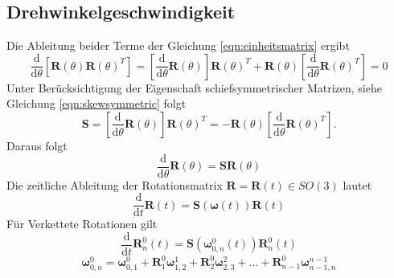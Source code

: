 \subsection{Drehwinkelgeschwindigkeit}
Die Ableitung beider Terme der Gleichung \ref{eqn:einheitsmatrix} ergibt
\begin{equation} 
	\frac{\text{d}}{\text{d}\theta}\left[\bm{R}(\theta)\bm{R}(\theta)^T\right] = 	\left[\frac{\text{d}}{\text{d}\theta} {\bm{R}}(\theta)\right]\bm{R}(\theta)^T + \bm{R}(\theta)\left[\frac{\text{d}}{\text{d}\theta} {\bm{R}}(\theta)^T\right] = 0
\end{equation} 
Unter Berücksichtigung der Eigenschaft schiefsymmetrischer Matrizen, siehe Gleichung \ref{eqn:skewsymmetric} folgt
\begin{equation}
	\label{eqn:skewsymm}
	\bm{S} = \left[\frac{\text{d}}{\text{d}\theta}{\bm{R}}(\theta)\right]\bm{R}(\theta)^T  = -\bm{R}(\theta)     \left[\frac{\text{d}}{\text{d}\theta}{\bm{R}}(\theta)^T\right].
\end{equation} 
%
Daraus folgt
%
\begin{equation}
	\frac{\text{d}}{\text{d}\theta}\bm{R}(\theta) = \bm{SR}(\theta)
\end{equation} 
%
Die zeitliche Ableitung der Rotationsmatrix $\bm{R} = \bm{R}(t) \in SO(3)$ lautet
%
\begin{equation}
	\frac{\text{d}}{\text{d}t}\bm{R}(t) = \bm{S}\left(\bm{\omega}(t)\right)\bm{R}(t)
\end{equation} 
%
Für Verkettete Rotationen gilt
%
\begin{equation}
	\frac{\text{d}}{\text{d}t}\bm{R}^0_n(t) = \bm{S}\left(\bm{\omega}^0_{0,n}(t)\right)\bm{R}^0_n(t)
\end{equation} 
\begin{equation}
	\bm{\omega}^0_{0,n} = \bm{\omega}^0_{0,1} + \bm{R}^0_1\bm{\omega}^1_{1,2} + \bm{R}^0_2\bm{\omega}^2_{2,3} + ... + \bm{R}^0_{n-1}\bm{\omega}^{n-1}_{n-1,n}
\end{equation} 
%
%

